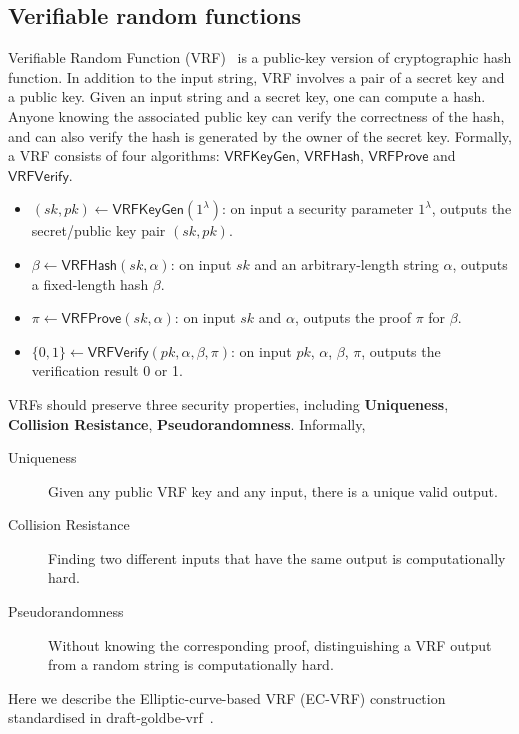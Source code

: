 \subsection{Verifiable random functions}

Verifiable Random Function (VRF)~\cite{micali1999verifiable} is a public-key version of cryptographic hash function.
In addition to the input string, VRF involves a pair of a secret key and a public key.
Given an input string and a secret key, one can compute a hash.
Anyone knowing the associated public key can verify the correctness of the hash, and can also verify the hash is generated by the owner of the secret key.
Formally, a VRF consists of four algorithms: $\mathsf{VRFKeyGen}$, $\mathsf{VRFHash}$, $\mathsf{VRFProve}$ and $\mathsf{VRFVerify}$.

\begin{itemize}
    \item $(sk, pk) \gets \mathsf{VRFKeyGen}(1^{\lambda})$: on input a security parameter $1^{\lambda}$, outputs the secret/public key pair $(sk, pk)$.
    \item $\beta \gets \mathsf{VRFHash}(sk, \alpha)$: on input $sk$ and an arbitrary-length string $\alpha$, outputs a fixed-length hash $\beta$.
    \item $\pi \gets \mathsf{VRFProve}(sk, \alpha)$: on input $sk$ and $\alpha$, outputs the proof $\pi$ for $\beta$.
    \item $\{0, 1\} \gets \mathsf{VRFVerify}(pk, \alpha, \beta, \pi)$: on input $pk$, $\alpha$, $\beta$, $\pi$, outputs the verification result 0 or 1.
\end{itemize}

VRFs should preserve three security properties, including \textbf{Uniqueness}, \textbf{Collision Resistance}, \textbf{Pseudorandomness}. Informally,

\begin{description}
    \item[Uniqueness] Given any public VRF key and any input, there is a unique valid output.
    \item[Collision Resistance] Finding two different inputs that have the same output is computationally hard.
    \item[Pseudorandomness] Without knowing the corresponding proof, distinguishing a VRF output from a random string is computationally hard.
\end{description}


Here we describe the Elliptic-curve-based VRF (EC-VRF) construction standardised in draft-goldbe-vrf~\cite{goldberg2017draft}.

